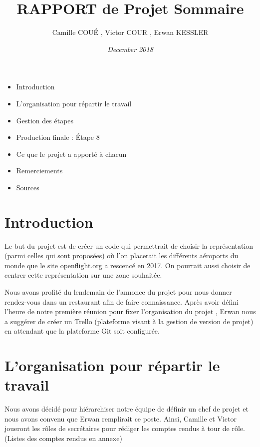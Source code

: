 \documentclass{article}
\title{\bf \color{orange} RAPPORT de Projet}
\author{\color{color2} Camille COUÉ , Victor COUR , Erwan KESSLER}
\date{\it December 2018}
\begin{document}
\maketitle


\title{\bf \Large \color{orange} Sommaire}
\begin{itemize}
    \color{color2}
    \item Introduction
    \item L'organisation pour répartir le travail 
    \item Gestion des étapes
    \item Production finale : Étape 8
    \item Ce que le projet a apporté à chacun
    \item Remerciements
    \item Sources
\end{itemize}
\color{orange} \section { Introduction }

\color{color2}

Le but du projet est de créer un code qui permettrait de choisir la représentation (parmi celles qui sont proposées) où l’on placerait les différents aéroports du monde que le site openflight.org a rescencé en 2017. On pourrait aussi choisir de centrer cette représentation sur une zone souhaitée.

\vspace{1\baselineskip}

Nous avons profité du lendemain de l’annonce du projet pour nous donner rendez-vous dans un restaurant afin de faire connaissance. Après avoir défini l’heure de notre première réunion pour fixer l’organisation du projet , Erwan nous a suggérer de créer un Trello (plateforme visant à la gestion de version de projet) en attendant que la plateforme Git soit configurée.

\vspace{1\baselineskip}

\color{orange} \section{ L'organisation pour répartir le travail }

\color{color2}

Nous avons décidé pour hiérarchiser notre équipe de définir un chef de projet et nous avons convenu que Erwan remplirait ce poste.
Ainsi, Camille et Victor joueront les rôles de secrétaires pour rédiger les comptes rendus à tour de rôle. (Listes des comptes rendus en annexe)
\end{document}
